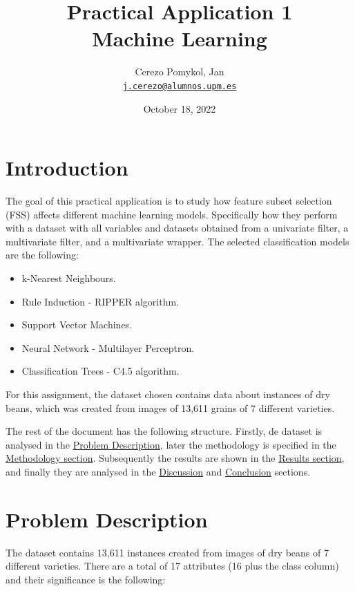 \documentclass[a4paper,11pt]{article}
\author{
	\Large Cerezo Pomykol, Jan\\ \href{mailto:j.cerezo@alumnos.upm.es}{\small\texttt{j.cerezo@alumnos.upm.es}}
}
\title{\textbf{\Huge Practical Application 1} \\
		\Large Machine Learning}
\date{\Large October 18, 2022}
\begin{document}
\maketitle
\vfill

\tableofcontents
\newpage

\section{Introduction}
\label{sec:introduction}

The goal of this practical application is to study how feature subset selection (FSS) affects different machine learning models. Specifically how they perform with a dataset with all variables and datasets obtained from a univariate filter, a multivariate filter, and a multivariate wrapper. The selected classification models are the following:

\begin{itemize}
\item k-Nearest Neighbours.
\item Rule Induction - RIPPER algorithm.
\item Support Vector Machines.
\item Neural Network - Multilayer Perceptron.
\item Classification Trees - C4.5 algorithm.
\end{itemize}

For this assignment, the dataset chosen \cite{misc_dry_bean_dataset_602}\cite{KOKLU2020105507} contains data about instances of dry beans, which was created from images of 13,611 grains of 7 different varieties.

The rest of the document has the following structure. Firstly, de dataset is analysed in the \hyperref[sec:problem]{Problem Description}, later the methodology is specified in the \hyperref[sec:methodology]{Methodology section}. Subsequently the results are shown in the \hyperref[sec:results]{Results section}, and finally they are analysed in the \hyperref[sec:discussion]{Discussion} and \hyperref[sec:conclusion]{Conclusion} sections.

\section{Problem Description}
\label{sec:problem}

The dataset contains 13,611 instances created from images of dry beans of 7 different varieties. There are a total of 17 attributes (16 plus the class column) and their significance is the following:
\end{document}
